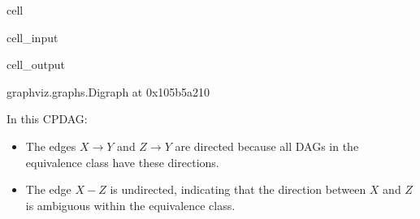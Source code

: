 \documentclass[letterpaper,10pt,english]{jupyterBook}
\begin{document}
\begin{sphinxuseclass}{cell}\begin{sphinxVerbatimInput}

\begin{sphinxuseclass}{cell_input}
\begin{sphinxVerbatim}[commandchars=\\\{\}]
  
 
 
    
\end{sphinxVerbatim}

\end{sphinxuseclass}\end{sphinxVerbatimInput}
\begin{sphinxVerbatimOutput}

\begin{sphinxuseclass}{cell_output}
\begin{sphinxVerbatim}[commandchars=\\\{\}]
\PYGZlt{}graphviz.graphs.Digraph at 0x105b5a210\PYGZgt{}
\end{sphinxVerbatim}

\end{sphinxuseclass}\end{sphinxVerbatimOutput}

\end{sphinxuseclass}
\sphinxAtStartPar
In this CPDAG:
\begin{itemize}
\item {} 
\sphinxAtStartPar
The edges \(X \to Y\) and \(Z \to Y\) are directed because all DAGs in the equivalence class have these directions.

\item {} 
\sphinxAtStartPar
The edge \(X - Z\) is undirected, indicating that the direction between \(X\) and \(Z\) is ambiguous within the equivalence class.

\end{itemize}
\end{document}
